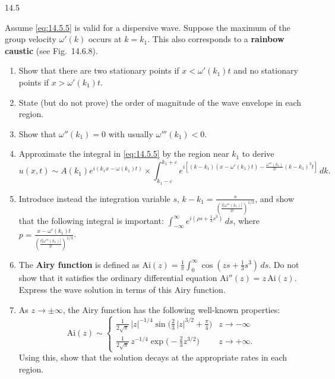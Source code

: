 \begin{exercises}{14.5}
\item Assume \eqref{eq:14.5.5} is valid for a dispersive wave.  Suppose the maximum of the group velocity $\omega'(k)$ occurs at $k = k_1$.  This also corresponds to a \textbf{rainbow caustic} (see Fig.~14.6.8).
\begin{enumerate}
\item[(a)] Show that there are two stationary points if $x < \omega'(k_1)t$ and no stationary points if $x > \omega'(k_1)t$.
\item[(b)] State (but do not prove) the order of magnitude of the wave envelope in each region.
\item[(c)] Show that $\omega''(k_1) = 0$ with usually $\omega'''(k_1) < 0$.
\item[(d)] Approximate the integral in \eqref{eq:14.5.5} by the region near $k_1$ to derive
\begin{equation}
\label{eq:14.5.8}
u(x,t) \sim A(k_1)e^{i(k_1 x - \omega(k_1)t)} \times \int_{k_1-\varepsilon}^{k_1+\varepsilon} e^{i[(k-k_1)(x - \omega'(k_1)t) - \frac{\omega'''(k_1)}{3!}(k-k_1)^3 t]}\,dk.
\end{equation}
\item[(e)] Introduce instead the integration variable $s$, $k - k_1 = \frac{s}{(\frac{t|\omega'''(k_1)|}{3!})^{1/3}}$, and show that the following integral is important: $\int_{-\infty}^{\infty} e^{i(\rho s + \frac{1}{3}s^3)}\,ds$, where $p = \frac{x - \omega'(k_1)t}{(\frac{t|\omega'''(k_1)|}{3!})^{1/3}}$.
\item[(f)] The \textbf{Airy function} is defined as $\text{Ai}(z) = \frac{1}{\pi}\int_0^{\infty}\cos(zs + \frac{1}{3}s^3)\,ds$.  Do not show that it satisfies the ordinary differential equation $\text{Ai}''(z) = z\,\text{Ai}(z)$.  Express the wave solution in terms of this Airy function.
\item[(g)] As $z \to \pm\infty$, the Airy function has the following well-known properties:
\begin{equation}
\label{eq:14.5.9}
\text{Ai}(z) \sim \begin{cases} \frac{1}{2\sqrt{\pi}}\,|z|^{-1/4}\sin\bigl(\frac{2}{3}\,|z|^{3/2} + \frac{\pi}{4}\bigr) & z \to -\infty \\[6pt] \frac{1}{2\sqrt{\pi}}\,z^{-1/4}\exp\bigl(-\frac{2}{3}z^{3/2}\bigr) & z \to +\infty. \end{cases}
\end{equation}
Using this, show that the solution decays at the appropriate rates in each region.
\end{enumerate}


\end{exercises}
